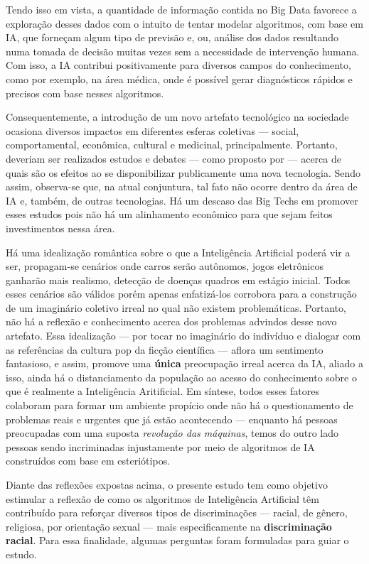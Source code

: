 Tendo isso em vista, a quantidade de informação contida no Big Data favorece a exploração desses dados com o intuito de tentar modelar algoritmos, com base em IA, que forneçam algum tipo de previsão e, ou, análise dos dados resultando numa tomada de decisão muitas vezes sem a necessidade de intervenção humana. Com isso, a IA contribui positivamente para diversos campos do conhecimento, como por exemplo, na área médica, onde é possível gerar diagnósticos rápidos e precisos com base nesses algoritmos.


Consequentemente, a introdução de um novo artefato tecnológico na sociedade ocasiona diversos impactos em diferentes esferas coletivas --- social, comportamental, econômica, cultural e medicinal, principalmente. Portanto, deveriam ser realizados estudos e debates --- como proposto por \citet{simon_jones_doing_2016}  --- acerca de quais são os efeitos ao se disponibilizar publicamente uma nova tecnologia. Sendo assim, observa-se que, na atual conjuntura, tal fato não ocorre dentro da área de IA e, também, de outras tecnologias. Há um descaso das Big Techs em promover esses estudos pois não há um alinhamento econômico para que sejam feitos investimentos nessa área.  

Há uma idealização romântica sobre o que a Inteligência Artificial poderá vir a ser, propagam-se cenários onde carros serão autônomos, jogos eletrônicos ganharão mais realismo, detecção de doenças quadros em estágio inicial. Todos esses cenários são válidos porém apenas enfatizá-los corrobora para a construção de um imaginário coletivo irreal no qual não existem problemáticas. Portanto, não há a reflexão e conhecimento acerca dos problemas advindos desse novo artefato. Essa idealização --- por tocar no imaginário do indivíduo e dialogar com as referências da cultura pop da ficção científica --- aflora um sentimento fantasioso, e assim, promove uma \textbf{única} preocupação irreal acerca da IA, aliado a isso, ainda há o distanciamento da população ao acesso do conhecimento sobre o que é realmente a Inteligência Aritificial. Em síntese, todos esses fatores colaboram para formar um ambiente propício onde não há o questionamento de problemas reais e urgentes que já estão acontecendo --- enquanto há pessoas preocupadas com uma suposta \textit{revolução das máquinas}, temos do outro lado pessoas sendo incriminadas injustamente por meio de algoritmos de IA construídos com base em esteriótipos.


Diante das reflexões expostas acima, o presente estudo tem como objetivo estimular a reflexão de como os algoritmos de Inteligência Artificial têm contribuído para reforçar diversos tipos de discriminações --- racial, de gênero, religiosa, por orientação sexual --- mais especificamente na \textbf{discriminação racial}. Para essa finalidade, algumas perguntas foram formuladas para guiar o estudo.

